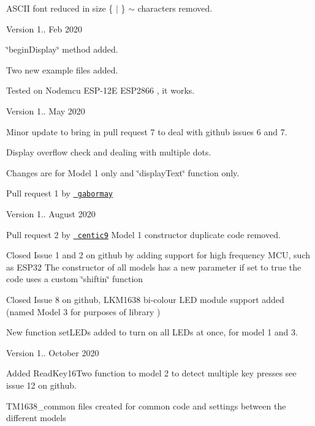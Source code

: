 \begin{DoxyItemize}
\begin{DoxyItemize}
\item ASCII font reduced in size \{ $\vert$ \} $\sim$ characters removed.
\end{DoxyItemize}
\item Version 1.. Feb 2020
\begin{DoxyItemize}
\item \char`\"{}begin\+Display\char`\"{} method added.
\item Two new example files added.
\item Tested on Nodemcu ESP-\/12E ESP2866 , it works.
\end{DoxyItemize}
\item Version 1.. May 2020
\begin{DoxyItemize}
\item Minor update to bring in pull request 7 to deal with github issues 6 and 7.
\item Display overflow check and dealing with multiple dots.
\item Changes are for Model 1 only and \char`\"{}display\+Text\char`\"{} function only.
\item Pull request 1 by \href{https://github.com/gabormay}{\texttt{ gabormay}}
\end{DoxyItemize}
\item Version 1.. August 2020
\begin{DoxyItemize}
\item Pull request 2 by \href{https://github.com/centic9}{\texttt{ centic9}} Model 1 constructor duplicate code removed.
\item Closed Issue 1 and 2 on github by adding support for high frequency MCU, such as ESP32 The constructor of all models has a new parameter if set to true the code uses a custom \char`\"{}shiftin\char`\"{} function
\item Closed Issue 8 on github, LKM1638 bi-\/colour LED module support added (named Model 3 for purposes of library )
\item New function set\+LEDs added to turn on all LEDs at once, for model 1 and 3.
\end{DoxyItemize}
\item Version 1.. October 2020
\begin{DoxyItemize}
\item Added Read\+Key16\+Two function to model 2 to detect multiple key presses see issue 12 on github.
\item TM1638\+\_\+common files created for common code and settings between the different models

\end{DoxyItemize}
\end{DoxyItemize}
